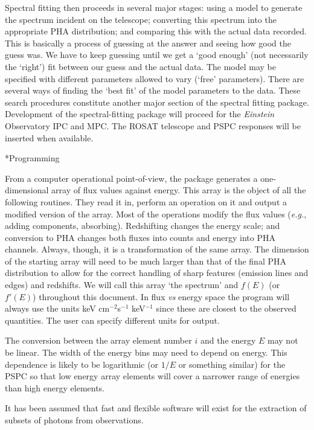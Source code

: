 Spectral fitting then proceeds in several major stages:  using a model to
generate the
spectrum incident on the telescope; converting this spectrum into the
appropriate PHA distribution; and comparing this with the
actual data recorded.  This is basically a process of guessing at the
answer and seeing how good the guess was.  We have to keep guessing until we
get a `good enough' (not necessarily the `right') fit between our guess and the actual
data.  The model may be specified with different parameters allowed to vary
(`free' parameters).  There are several ways of finding the `best fit' of
the model parameters to the data.  These search
procedures constitute another major section of the spectral fitting
package.  Development of the spectral-fitting package will proceed for
the {\it Einstein} Observatory IPC and MPC.  The ROSAT telescope and
PSPC responses will be inserted when available.

\**Programming

From a computer operational point-of-view, the package generates a
one-dimensional array of flux values against energy.  This array is the object
of all the following routines.  They read it in, perform an operation on it
and output a modified version of the array.  Most of the operations modify
the flux values ({\it e.g.}, adding components, absorbing).  Redshifting changes
the energy scale; and conversion to PHA changes both fluxes into counts and
energy into PHA channels.  Always, though, it is a transformation of the same
array.  The dimension of the starting array will need to be much larger than
that of the final PHA distribution to allow for the correct handling of sharp
features (emission lines and edges) and redshifts.  We will call this array
`the spectrum' and $f(E)$ (or $f'(E)$) throughout this document.  In
flux {\it vs} energy
space the program will always use the units keV cm$^{-2}$s$^{-1}$ keV$^{-1}$
since these are closest to the observed quantities.  The user can specify
different units for output.

The conversion between the array element number $i$ and the energy $E$ may not
be linear.  The width of the energy bins may need to depend on energy.  This
dependence is likely to be logarithmic (or $1/E$ or something similar)
for the PSPC so that low energy array elements will cover a
narrower range of energies than high energy elements.

It has been assumed that fast and flexible software will exist for the
extraction of subsets of photons from observations.

